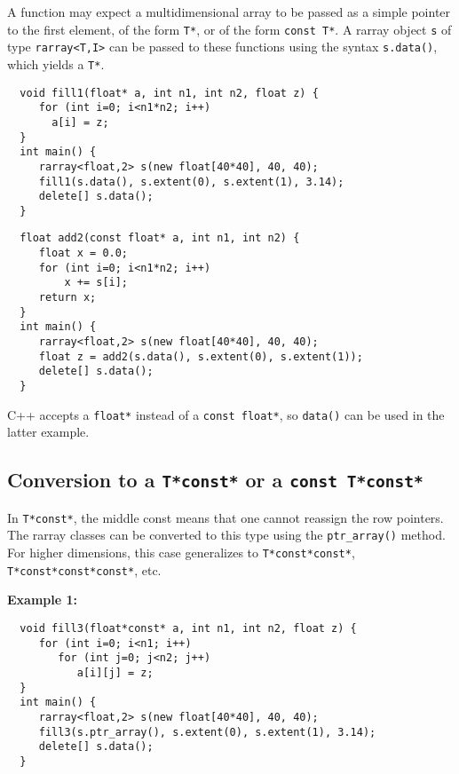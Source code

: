 \documentclass[12pt,twoside]{article}
\begin{document}
A function may expect a multidimensional array to be passed as a
simple pointer to the first element, of the form \texttt{T*}, or of the form  \texttt{const T*}. A rarray object
\texttt{s} of type \texttt{rarray{\tt<}T,I{\tt>}} can be passed to these
functions using the syntax \texttt{s.data()}, which yields a
\texttt{T*}.

\begin{framed}\vspace{-9pt}%
\begin{verbatim}
  void fill1(float* a, int n1, int n2, float z) {
     for (int i=0; i<n1*n2; i++)
       a[i] = z;
  }
  int main() {
     rarray<float,2> s(new float[40*40], 40, 40);
     fill1(s.data(), s.extent(0), s.extent(1), 3.14);
     delete[] s.data();
  }
\end{verbatim}
\end{framed}

\vspace{-5pt}\begin{framed}\vspace{-14pt}%
\begin{verbatim}
  float add2(const float* a, int n1, int n2) {
     float x = 0.0;
     for (int i=0; i<n1*n2; i++)
         x += s[i];
     return x;
  }
  int main() {
     rarray<float,2> s(new float[40*40], 40, 40);
     float z = add2(s.data(), s.extent(0), s.extent(1));
     delete[] s.data();
  }
\end{verbatim}
\vspace{-14pt}\end{framed}\vspace{-8pt}

\noindent
C++ accepts a \texttt{float*} instead of a \texttt{const float*}, so \texttt{data()} can be used in the latter example.

\subsection{Conversion to a {\tt T*const*} or a {\tt const T*const*} }

\noindent
In \texttt{T*const*}, the middle const means that one cannot reassign the row pointers.
The rarray classes can be converted to this type using the \texttt{ptr\_array()} method. 
For higher dimensions, this case generalizes to \texttt{T*const*const*}, \texttt{T*const*const*const*}, etc.

\noindent
{\bf Example 1:}
\vspace{-5pt}\begin{framed}\vspace{-14pt}%
\begin{verbatim}
  void fill3(float*const* a, int n1, int n2, float z) {
     for (int i=0; i<n1; i++)
        for (int j=0; j<n2; j++)
           a[i][j] = z;
  }
  int main() {
     rarray<float,2> s(new float[40*40], 40, 40);
     fill3(s.ptr_array(), s.extent(0), s.extent(1), 3.14);
     delete[] s.data();
  }
\end{verbatim}
\vspace{-14pt}\end{framed}\vspace{-8pt}
\end{document}
